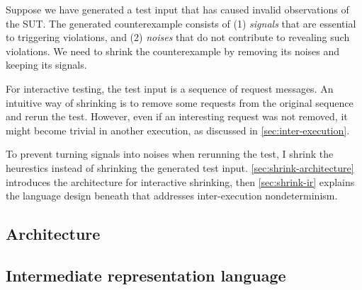 Suppose we have generated a test input that has caused invalid observations of
the SUT.  The generated counterexample consists of (1) {\em signals} that are
essential to triggering violations, and (2) {\em noises} that do not contribute
to revealing such violations.  We need to shrink the counterexample by removing
its noises and keeping its signals.

For interactive testing, the test input is a sequence of request messages.  An
intuitive way of shrinking is to remove some requests from the original sequence
and rerun the test.  However, even if an interesting request was not removed, it
might become trivial in another execution, as discussed in
\autoref{sec:inter-execution}.

To prevent turning signals into noises when rerunning the test, I shrink the
heurestics instead of shrinking the generated test input.
\autoref{sec:shrink-architecture} introduces the architecture for interactive
shrinking, then \autoref{sec:shrink-ir} explains the language design beneath
that addresses inter-execution nondeterminism.

\subsection{Architecture}
\label{sec:shrink-architecture}

\subsection{Intermediate representation language}
\label{sec:shrink-ir}
